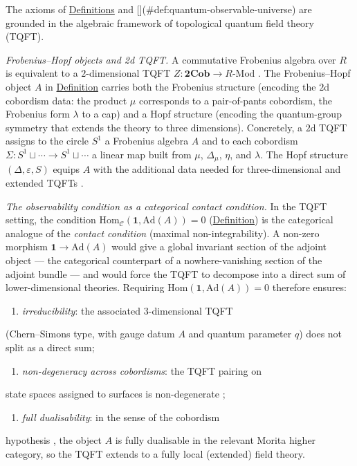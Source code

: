 \begin{remark}
  \label{rem:tqft-context}
The axioms of
\hyperref[def:quantum-universe]{Definitions}
and [](#def:quantum-observable-universe) are grounded in the algebraic
framework of topological quantum field theory (TQFT).

\emph{Frobenius--Hopf objects and 2d TQFT.}
A commutative Frobenius algebra over $R$ is equivalent to a
$2$-dimensional TQFT
$Z \colon \mathbf{2Cob} \to R\text{-}\mathrm{Mod}$
\cite{kock2004, atiyah1988}. The Frobenius--Hopf object $A$ in
\hyperref[def:quantum-universe]{Definition} carries both the Frobenius structure
(encoding the $2$d cobordism data: the product $\mu$ corresponds to a
pair-of-pants cobordism, the Frobenius form $\lambda$ to a cap) and a
Hopf structure (encoding the quantum-group symmetry that extends the theory
to three dimensions). Concretely, a $2$d TQFT assigns to
the circle $S^1$ a Frobenius algebra $A$ and to each cobordism
$\Sigma \colon S^1 \sqcup \cdots \to S^1 \sqcup \cdots$ a linear map
built from $\mu$, $\Delta_\mu$, $\eta$, and $\lambda$. The Hopf
structure $(\Delta, \varepsilon, S)$ equips $A$ with the additional data
needed for three-dimensional and extended TQFTs
\cite{turaev2010, witten1988}.

\emph{The observability condition as a categorical contact condition.}
In the TQFT setting, the condition
$\mathrm{Hom}_{\mathcal{C}}(\mathbf{1}, \mathrm{Ad}(A)) = 0$
(\hyperref[def:quantum-observable-universe]{Definition}) is the categorical
analogue of the \emph{contact condition} (maximal non-integrability).
A non-zero morphism $\mathbf{1} \to \mathrm{Ad}(A)$ would give a
global invariant section of the adjoint object --- the categorical
counterpart of a nowhere-vanishing section of the adjoint bundle --- and
would force the TQFT to decompose into a direct sum of
lower-dimensional theories. Requiring
$\mathrm{Hom}(\mathbf{1}, \mathrm{Ad}(A)) = 0$ therefore ensures:

\begin{enumerate}
  \item \emph{irreducibility}: the associated $3$-dimensional TQFT
\end{enumerate}
   (Chern--Simons type, with gauge datum $A$ and quantum
   parameter $q$) does not split as a direct sum;
\begin{enumerate}
  \item \emph{non-degeneracy across cobordisms}: the TQFT pairing on
\end{enumerate}
   state spaces assigned to surfaces is non-degenerate
   \cite{freed2010};
\begin{enumerate}
  \item \emph{full dualisability}: in the sense of the cobordism
\end{enumerate}
   hypothesis \cite{baez1995, lurie2009}, the object $A$ is
   fully dualisable in the relevant Morita higher category, so the
   TQFT extends to a fully local (extended) field theory.


\end{remark}
